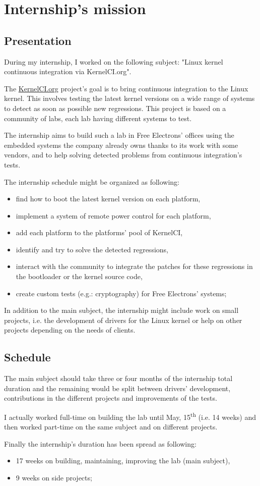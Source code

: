 \chapter{Internship's mission}

\section{Presentation}
During my internship, I worked on the following subject: "Linux kernel continuous integration via KernelCI.org".

The \href{https://kernelci.org}{KernelCI.org} project's goal is to bring continuous integration to the Linux kernel. This involves testing the latest kernel versions on a wide range of systems to detect as soon as possible new regressions. This project is based on a community of labs, each lab having different systems to test.

The internship aims to build such a lab in Free Electrons' offices using the embedded systems the company already owns thanks to its work with some vendors, and to help solving detected problems from continuous integration's tests.

The internship schedule might be organized as following:
\begin{itemize}
  \item find how to boot the latest kernel version on each platform,
  \item implement a system of remote power control for each platform,
  \item add each platform to the platforms' pool of KernelCI,
  \item identify and try to solve the detected regressions,
  \item interact with the community to integrate the patches for these regressions in the bootloader or the kernel source code,
  \item create custom tests (e.g.: cryptography) for Free Electrons' systems;
\end{itemize}

In addition to the main subject, the internship might include work on small projects, i.e. the development of drivers for the Linux kernel or help on other projects depending on the needs of clients.

\section{Schedule}
The main subject should take three or four months of the internship total duration and the remaining would be split between drivers' development, contributions in the different projects and improvements of the tests.

I actually worked full-time on building the lab until May, 15\textsuperscript{th} (i.e. 14 weeks) and then worked part-time on the same subject and on different projects.

Finally the internship's duration has been spread as following:
\begin{itemize}
  \item 17 weeks on building, maintaining, improving the lab (main subject),
  \item 9 weeks on side projects;
\end{itemize}
